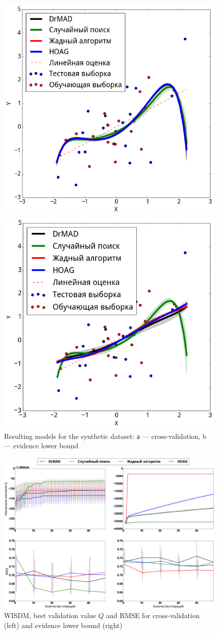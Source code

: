     \begin{figure}

    
    \includegraphics[width=0.5\linewidth]{plots/hyperparams/poly_cv.png}

    \includegraphics[width=0.5\linewidth]{plots/hyperparams/poly_var.png}

    
 \caption{Resulting models for the synthetic dataset: а --- cross-validation, b --- evidence lower bound}
  \label{fig:poly}
   
    \end{figure}




    \begin{figure}

    \includegraphics[width=0.5\linewidth]{plots/hyperparams/wisdm.png}
\caption{WISDM,  best validation value $\hat{Q}$ and RMSE  for cross-validation (left) and evidence lower bound (right)}    
\label{fig:wisdm}
    
    \end{figure}


